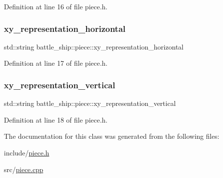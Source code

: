 Definition at line 16 of file piece.\+h.

\mbox{\label{classbattle__ship_1_1piece_a3414f7d2e4058f20e547881b6e41cf70}} 
\subsubsection{\texorpdfstring{xy\+\_\+representation\+\_\+horizontal}{xy\_representation\_horizontal}}
{\footnotesize\ttfamily std\+::string battle\+\_\+ship\+::piece\+::xy\+\_\+representation\+\_\+horizontal\hspace{0.3cm}{\ttfamily [protected]}}



Definition at line 17 of file piece.\+h.

\mbox{\label{classbattle__ship_1_1piece_ac102a65c66a64259f133736c02090a3e}} 
\subsubsection{\texorpdfstring{xy\+\_\+representation\+\_\+vertical}{xy\_representation\_vertical}}
{\footnotesize\ttfamily std\+::string battle\+\_\+ship\+::piece\+::xy\+\_\+representation\+\_\+vertical\hspace{0.3cm}{\ttfamily [protected]}}



Definition at line 18 of file piece.\+h.



The documentation for this class was generated from the following files\+:\begin{DoxyCompactItemize}
\item 
include/\hyperlink{piece_8h}{piece.\+h}\item 
src/\hyperlink{piece_8cpp}{piece.\+cpp}\end{DoxyCompactItemize}
